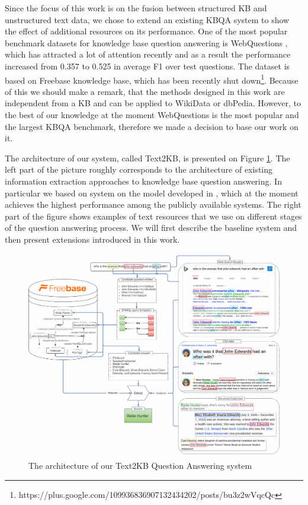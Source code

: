 
Since the focus of this work is on the fusion between structured KB and unstructured text data, we chose to extend an existing KBQA system to show the effect of additional resources on its performance.
One of the most popular benchmark datasets for knowledge base question answering is WebQuestions \cite{Berant:EMNLP13}, which has attracted a lot of attention recently and as a result the performance increased from 0.357 \cite{Berant:EMNLP13} to 0.525 \cite{yih2015semantic} in average F1 over test questions.
The dataset is based on Freebase knowledge base, which has been recently shut down\footnote{https://plus.google.com/109936836907132434202/posts/bu3z2wVqcQc}.
Because of this we should make a remark, that the methods designed in this work are independent from a KB and can be applied to WikiData or dbPedia.
However, to the best of our knowledge at the moment WebQuestions is the most popular and the largest KBQA benchmark, therefore we made a decision to base our work on it.

The architecture of our system, called Text2KB, is presented on Figure \ref{fig:model}. 
The left part of the picture roughly corresponds to the architecture of existing information extraction approaches to knowledge base question answering.
In particular we based on system on the model developed in \cite{ACCU:2015}, which at the moment achieves the highest performance among the publicly available systems.
The right part of the figure shows examples of text resources that we use on different stages of the question answering process.
We will first describe the baseline system and then present extensions introduced in this work.

\begin{figure}[t]
\centering
\includegraphics[width=\textwidth]{img/Text2KB_model}
\caption{The architecture of our Text2KB Question Answering system}
\label{fig:model}
\end{figure}

